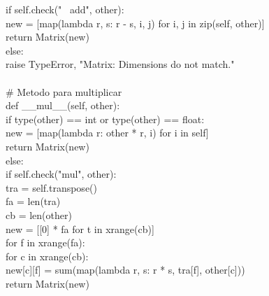 \documentclass[10pt,letterpaper]{article}
\newenvironment{Code}
{
\begin{lrbox}{\selvestebox}%
\begin{minipage}{\dimexpr\columnwidth-2\fboxsep\relax}
\fontfamily{\ttdefault}\selectfont
}
{\end{minipage}\end{lrbox}%
\begin{center}
\colorbox{light-gray}{\usebox{\selvestebox}}
\end{center}
}
\begin{document}
\begin{scriptsize}
\begin{Code}
\hspace*{11mm} if self.check("\ \hspace*{-3mm} add", other):\\
\hspace*{17mm} new = [map(lambda r, s: r - s, i, j) for i, j in zip(self, other)]\\
\hspace*{17mm} return Matrix(new)\\
\hspace*{11mm} else:\\
\hspace*{17mm} raise TypeError, "Matrix: Dimensions do not match."\\
\\
\hspace*{5mm} \# Metodo para multiplicar\\
\hspace*{5mm} def \_\_mul\_\_(self, other):\\
\hspace*{11mm} if type(other) == int or type(other) == float:\\
\hspace*{17mm} new = [map(lambda r: other * r, i) for i in self]\\
\hspace*{17mm} return Matrix(new)\\
\hspace*{11mm} else:\\
\hspace*{17mm} if self.check("mul", other):\\
\hspace*{23mm} tra = self.transpose()\\
\hspace*{23mm} fa = len(tra)\\
\hspace*{23mm} cb = len(other)\\
\hspace*{23mm} new = [[0] * fa for t in xrange(cb)]\\
\hspace*{23mm} for f in xrange(fa):\\
\hspace*{29mm} for c in xrange(cb):\\
\hspace*{35mm} new[c][f] = sum(map(lambda r, s: r * s, tra[f], other[c]))\\
\hspace*{23mm} return Matrix(new)\\

\end{Code}
\end{scriptsize}
\end{document}
